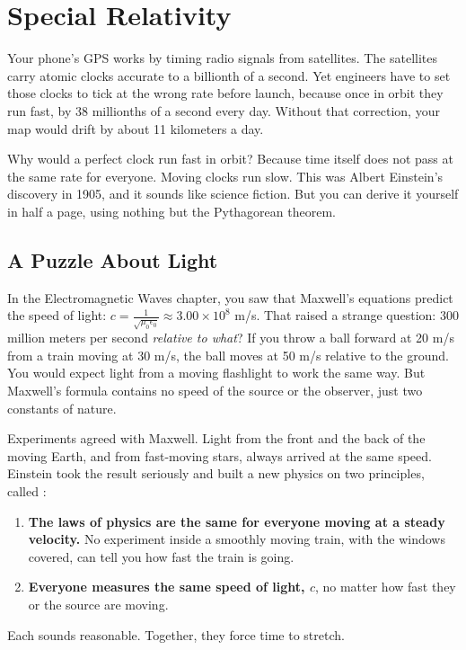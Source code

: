 \chapter{Special Relativity}

Your phone's GPS works by timing radio signals from satellites. The satellites carry atomic
clocks accurate to a billionth of a second. Yet engineers have to set those clocks to tick at
the wrong rate before launch, because once in orbit they run fast, by 38 millionths of a second
every day. Without that correction, your map would drift by about 11 kilometers a day.

Why would a perfect clock run fast in orbit? Because time itself does not pass at the same rate
for everyone. Moving clocks run slow. This was Albert Einstein's discovery in 1905, and it
sounds like science fiction. But you can derive it yourself in half a page, using nothing but
the Pythagorean theorem.

\section{A Puzzle About Light}
In the Electromagnetic Waves chapter, you saw that Maxwell's equations predict the speed of
light: $c = \frac{1}{\sqrt{\mu_0\epsilon_0}} \approx 3.00 \times 10^8$ m/s. That raised a strange
question: 300 million meters per second \emph{relative to what}? If you throw a ball forward at
20 m/s from a train moving at 30 m/s, the ball moves at 50 m/s relative to the ground. You would
expect light from a moving flashlight to work the same way. But Maxwell's formula contains no
speed of the source or the observer, just two constants of nature.

Experiments agreed with Maxwell. Light from the front and the back of the moving Earth, and from
fast-moving stars, always arrived at the same speed. Einstein took the result seriously and built
a new physics on two principles, called :
\begin{enumerate}
\item \textbf{The laws of physics are the same for everyone moving at a steady velocity.} No
experiment inside a smoothly moving train, with the windows covered, can tell you how fast the
train is going.
\item \textbf{Everyone measures the same speed of light, $c$}, no matter how fast they or the
source are moving.
\end{enumerate}
Each sounds reasonable. Together, they force time to stretch.

